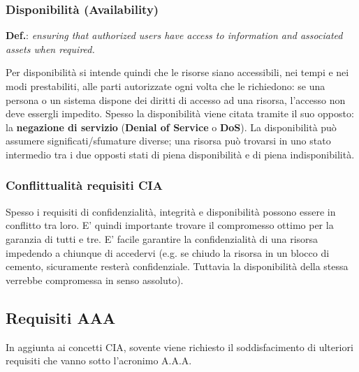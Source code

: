 \subsubsection{Disponibilità (Availability)}
\textbf{Def.}:\textit{ ensuring that authorized users have access to information and associated assets when required.} \newline

Per disponibilità si intende quindi che le risorse siano accessibili, nei tempi e nei modi prestabiliti, alle parti autorizzate ogni volta che le richiedono: se una persona o un sistema dispone dei diritti di accesso ad una risorsa, l’accesso non deve essergli impedito. Spesso la disponibilità viene citata tramite il suo opposto: la \textbf{negazione di servizio} (\textbf{Denial of Service} o \textbf{DoS}). La disponibilità può assumere significati/sfumature diverse; una risorsa può trovarsi in uno stato intermedio tra i due opposti stati di piena disponibilità e di piena indisponibilità.

\subsubsection{Conflittualità requisiti CIA}
Spesso i requisiti di confidenzialità, integrità e disponibilità possono essere in conflitto tra loro. E' quindi importante trovare il compromesso ottimo per la garanzia di tutti e tre. E' facile garantire la confidenzialità di una risorsa impedendo a chiunque di accedervi (e.g. se chiudo la risorsa in un blocco di cemento, sicuramente resterà confidenziale. Tuttavia la disponibilità della stessa verrebbe compromessa in senso assoluto).

\subsection{Requisiti AAA}
In aggiunta ai concetti CIA, sovente viene richiesto il soddisfacimento di ulteriori requisiti che vanno sotto l’acronimo A.A.A.

